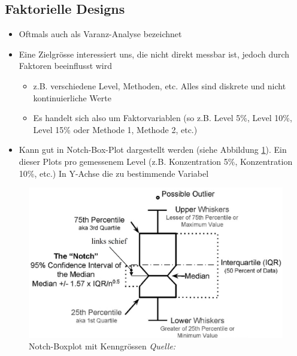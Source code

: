 \subsection{Faktorielle Designs}
\begin{itemize}
	\item Oftmals auch als Varanz-Analyse bezeichnet
	\item Eine Zielgrösse interessiert uns, die nicht direkt messbar ist, jedoch durch Faktoren beeinflusst wird
	\begin{itemize}
		\item z.B. verschiedene Level, Methoden, etc. Alles sind diskrete und nicht kontinuierliche Werte
		\item Es handelt sich also um Faktorvariablen (so z.B. Level 5\%, Level 10\%, Level 15\% oder Methode 1, Methode 2, etc.)
	\end{itemize}
	\item Kann gut in Notch-Box-Plot dargestellt werden (siehe Abbildung \ref{fig:notchedboxplot}). Ein dieser Plots pro gemessenem Level (z.B. Konzentration 5\%, Konzentration 10\%, etc.) In Y-Achse die zu bestimmende Variabel
\end{itemize}
\begin{figure}[h]
	\centering
	\includegraphics[width=0.5\linewidth]{figures/NotchedBoxPlot}
	\caption{Notch-Boxplot mit Kenngrössen \textit{Quelle:} \cite{C:NotchBoxPlot}}
	\label{fig:notchedboxplot}
\end{figure}

